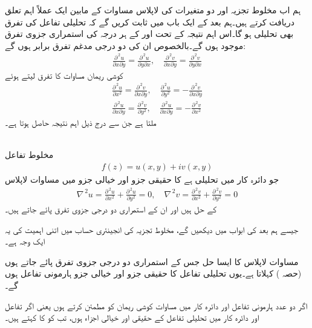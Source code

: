 ہم اب مخلوط تجزیہ اور دو متغیرات کی لاپلاس مساوات کے مابین ایک عملاً اہم تعلق دریافت کرتے ہیں۔ہم بعد کے ایک باب میں ثابت کریں گے کہ تحلیلی تفاعل  کی تفرق بھی تحلیلی ہو گا۔اس اہم نتیجہ کے تحت  اور  کے ہر درجہ کی استمراری جزوی تفرق موجود ہوں گے۔بالخصوص ان کی دو درجی مدغم تفرق برابر ہوں گے:
\begin{align*}
\frac{\partial^{\,2}u}{\partial x\partial y}=\frac{\partial^{\,2}u}{\partial y\partial x},\quad\frac{\partial^{\,2}v}{\partial x\partial y}=\frac{\partial^{\,2}v}{\partial y\partial x}
\end{align*}
کوشی ریمان مساوات کا تفرق لیتے ہوئے
\begin{align*}
\frac{\partial^{\,2}u}{\partial x^2}=\frac{\partial^{\,2}v}{\partial x\partial y},\quad \frac{\partial^{\,2}u}{\partial y^2}=-\frac{\partial^{\,2}v}{\partial x\partial y}\\
\frac{\partial^{\,2}u}{\partial x\partial y}=\frac{\partial^{\,2}v}{\partial y^2},\quad \frac{\partial^{\,2}u}{\partial x\partial y}=-\frac{\partial^{\,2}v}{\partial x^2}
\end{align*}
ملتا ہے جن سے درج ذیل اہم نتیجہ حاصل ہوتا ہے۔

\quad {}\\
مخلوط تفاعل
\begin{align*}
f(z)=u(x,y)+iv(x,y)
\end{align*}
جو  دائرہ کار  میں تحلیلی ہے کا حقیقی جزو اور  خیالی جزو    میں مساوات لاپلاس
\begin{align*}
\nabla^{\,2}u=\frac{\partial^{\,2}u}{\partial x^2}+\frac{\partial^{\,2}u}{\partial y^2}=0,\quad \nabla^{\,2}v=\frac{\partial^{\,2}v}{\partial x^2}+\frac{\partial^{\,2}v}{\partial y^2}=0
\end{align*}
کے حل ہیں اور ان کے استمراری دو درجی جزوی تفرق پائے جاتے ہیں۔

جیسے ہم بعد کی ابواب میں دیکھیں گے، مخلوط تجزیہ کی انجینئری  حساب میں اتنی اہمیت کی یہ ایک وجہ ہے۔

مساوات لاپلاس کا ایسا حل جس کے استمراری دو درجی جزوی تفرق پائے جاتے ہوں   (حصہ ) کہلاتا ہے۔یوں تحلیلی تفاعل کا حقیقی  جزو اور خیالی جزو ہارمونی تفاعل ہوں گے۔

اگر دو عدد ہارمونی تفاعل  اور  دائرہ کار  میں مساوات کوشی ریمان  کو مطمئن کرتے ہوں یعنی اگر تفاعل  اور  دائرہ کار  میں تحلیلی تفاعل  کے حقیقی اور خیالی اجزاء ہوں، تب کو  کا  کہتے ہیں۔

